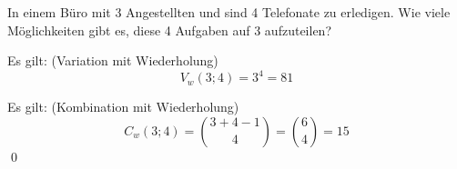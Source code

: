\documentclass{abgabe}
\begin{document}
\begin{questions}
    \question
    In einem Büro mit 3 Angestellten und sind 4 Telefonate zu erledigen. 
    Wie viele Möglichkeiten gibt es, diese 4 Aufgaben auf 3 aufzuteilen?
    \begin{solution}
        Es gilt: (Variation mit Wiederholung)
        \[ 
            V_w(3;4) = 3^4 = 81
        \]
        
        
        Es gilt: (Kombination mit Wiederholung)
        \[ 
            C_w(3;4) = \binom{3 + 4 - 1}{4} = \binom{6}{4} = 15
        \]
        \qed
    \end{solution}
\end{questions}
\end{document}
